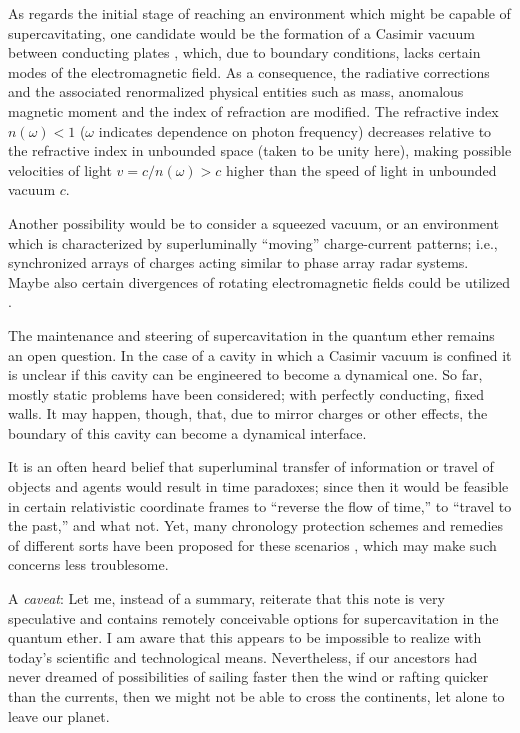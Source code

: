 As regards the initial stage of reaching an environment
which might be capable of supercavitating,
one candidate would be the formation of a Casimir vacuum between conducting plates
\cite{milonni-book}, which, due to boundary conditions,
lacks certain modes of the electromagnetic field.
As a consequence, the radiative corrections and the associated renormalized
physical entities such as mass, anomalous magnetic moment
\cite{1996-mass} and the index of refraction  \cite{scharnhorst}
are modified.
The refractive index $n(\omega )<1$ ($\omega$ indicates dependence on photon frequency)
decreases relative to the refractive index in unbounded space (taken to be unity here),
making possible velocities of light $v=c/ n(\omega )>c$ higher than the speed of light in unbounded  vacuum $c$.


Another possibility would be to consider a squeezed vacuum, or an environment
which is characterized by superluminally ``moving'' charge-current patterns;
i.e., synchronized arrays of charges acting similar to phase array radar systems.
Maybe also certain divergences of rotating electromagnetic fields could be utilized
\cite{arda:84}.

The maintenance and steering of supercavitation in the quantum ether remains an open question.
In the case of a cavity in which a  Casimir vacuum is confined
it is unclear if this cavity can be engineered to become a dynamical one.
So far, mostly static problems have been considered; with perfectly conducting, fixed walls.
It may happen, though, that, due to mirror charges or other effects,
the boundary  of this cavity can become a dynamical interface.

It is an often heard belief that superluminal transfer of information
or travel of objects and agents would result in time paradoxes; since then it would be
feasible in certain relativistic coordinate frames to ``reverse the flow of time,''  to
``travel to the past,'' and what not.
Yet, many chronology protection schemes and remedies of different sorts
have been proposed for these scenarios
\cite{godel-sch,recami:01,nahin,svozil-2001-convention},
which  may make such concerns less troublesome.


A {\em caveat}: Let me, instead of a summary, reiterate that this note is very speculative
and contains remotely conceivable options for supercavitation in
the quantum ether. I am aware that this appears to be impossible to realize with
today's scientific and technological means.
Nevertheless, if our ancestors had never dreamed of possibilities of sailing faster
then the wind or rafting quicker than the currents, then we might
not be able to cross the continents, let alone to leave our planet.

